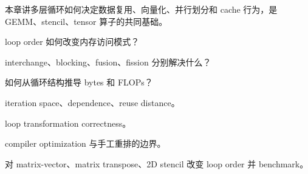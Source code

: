 {本章讲多层循环如何决定数据复用、向量化、并行划分和 cache 行为，是 GEMM、stencil、tensor 算子的共同基础。}
{\item loop order 如何改变内存访问模式？
\item interchange、blocking、fusion、fission 分别解决什么？
\item 如何从循环结构推导 bytes 和 FLOPs？}
{\item iteration space、dependence、reuse distance。
\item loop transformation correctness。
\item compiler optimization 与手工重排的边界。}
{对 matrix-vector、matrix transpose、2D stencil 改变 loop order 并 benchmark。}
